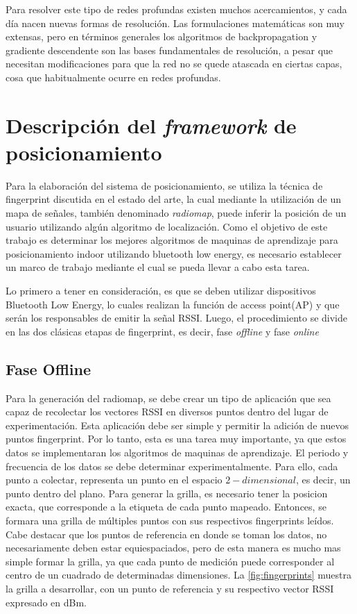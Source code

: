 Para resolver este tipo de redes profundas existen muchos acercamientos, y cada día nacen nuevas formas de resolución. Las formulaciones matemáticas son muy extensas, pero en términos generales los algoritmos de backpropagation y gradiente descendente son las bases fundamentales de resolución, a pesar que necesitan modificaciones para que la red no se quede atascada en ciertas capas, cosa que habitualmente ocurre en redes profundas.

\section{Descripción del \textit{framework} de posicionamiento}

Para la elaboración del sistema de posicionamiento, se utiliza la técnica de fingerprint discutida en el estado del arte, la cual mediante la utilización de un mapa de señales, también denominado \textit{radiomap}, puede inferir la posición de un usuario utilizando algún algoritmo de localización. Como el objetivo de este trabajo es determinar los mejores algoritmos de maquinas de aprendizaje para posicionamiento indoor utilizando bluetooth low energy, es necesario establecer un marco de trabajo mediante el cual se pueda llevar a cabo esta tarea.

Lo primero a tener en consideración, es que se deben utilizar dispositivos Bluetooth Low Energy, lo cuales realizan la función de access point(AP) y que serán los responsables de emitir la señal RSSI. Luego, el procedimiento se divide en las dos clásicas etapas de fingerprint, es decir, fase \textit{offline} y fase \textit{online}

\subsection{Fase Offline}

Para la generación del radiomap, se debe crear un tipo de aplicación que sea capaz de recolectar los vectores RSSI en diversos puntos dentro del lugar de experimentación. Esta aplicación debe ser simple y permitir la adición de nuevos puntos fingerprint. Por lo tanto, esta es una tarea muy importante, ya que estos datos se implementaran los algoritmos de maquinas de aprendizaje. El periodo y frecuencia de los datos se debe determinar experimentalmente. Para ello, cada punto a colectar, representa un punto en el espacio $2-dimensional$, es decir, un punto dentro del plano. Para generar la grilla, es necesario tener la posicion exacta, que corresponde a la etiqueta de cada punto mapeado. Entonces, se formara una grilla de múltiples puntos con sus respectivos fingerprints leídos. Cabe destacar que los puntos de referencia en donde se toman los datos, no necesariamente deben estar equiespaciados, pero de esta manera es mucho mas simple formar la grilla, ya que cada punto de medición puede corresponder al centro de un cuadrado de determinadas dimensiones. La \autoref{fig:fingerprints} muestra la grilla a desarrollar, con un punto de referencia y su respectivo vector RSSI expresado en dBm.

